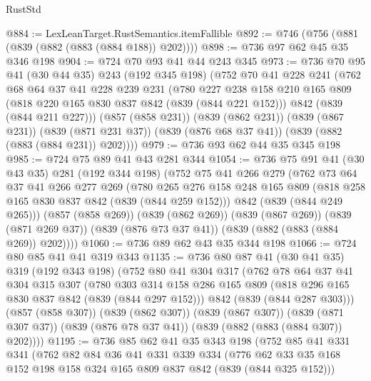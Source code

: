 \begin{lexlean}{RustStd}
\begin{coremodule}
@884 := LexLeanTarget.RustSemantics.itemFallible
@892 := @746 (@756 (@881 (@839 (@882 (@883 (@884 @188)) @202))))
@898 := @736 @97 @62 @45 @35 @346 @198
@904 := @724 @70 @93 @41 @44 @243 @345
@973 := @736
    @70
    @95
    @41
    (@30 @44 @35)
    @243
    (@192 @345 @198)
    (@752
      @70
      @41
      @228
      @241
      (@762
        @68
        @64
        @37
        @41
        @228
        @239
        @231
        (@780
          @227
          @238
          @158
          @210
          @165
          @809
          (@818 @220 @165 @830 @837 @842 (@839 (@844 @221 @152)))
          @842
          (@839 (@844 @211 @227)))
        (@857 (@858 @231))
        (@839 (@862 @231))
        (@839 (@867 @231))
        (@839 (@871 @231 @37))
        (@839 (@876 @68 @37 @41))
        (@839 (@882 (@883 (@884 @231)) @202))))
@979 := @736 @93 @62 @44 @35 @345 @198
@985 := @724 @75 @89 @41 @43 @281 @344
@1054 := @736
    @75
    @91
    @41
    (@30 @43 @35)
    @281
    (@192 @344 @198)
    (@752
      @75
      @41
      @266
      @279
      (@762
        @73
        @64
        @37
        @41
        @266
        @277
        @269
        (@780
          @265
          @276
          @158
          @248
          @165
          @809
          (@818 @258 @165 @830 @837 @842 (@839 (@844 @259 @152)))
          @842
          (@839 (@844 @249 @265)))
        (@857 (@858 @269))
        (@839 (@862 @269))
        (@839 (@867 @269))
        (@839 (@871 @269 @37))
        (@839 (@876 @73 @37 @41))
        (@839 (@882 (@883 (@884 @269)) @202))))
@1060 := @736 @89 @62 @43 @35 @344 @198
@1066 := @724 @80 @85 @41 @41 @319 @343
@1135 := @736
    @80
    @87
    @41
    (@30 @41 @35)
    @319
    (@192 @343 @198)
    (@752
      @80
      @41
      @304
      @317
      (@762
        @78
        @64
        @37
        @41
        @304
        @315
        @307
        (@780
          @303
          @314
          @158
          @286
          @165
          @809
          (@818 @296 @165 @830 @837 @842 (@839 (@844 @297 @152)))
          @842
          (@839 (@844 @287 @303)))
        (@857 (@858 @307))
        (@839 (@862 @307))
        (@839 (@867 @307))
        (@839 (@871 @307 @37))
        (@839 (@876 @78 @37 @41))
        (@839 (@882 (@883 (@884 @307)) @202))))
@1195 := @736
    @85
    @62
    @41
    @35
    @343
    @198
    (@752
      @85
      @41
      @331
      @341
      (@762
        @82
        @84
        @36
        @41
        @331
        @339
        @334
        (@776 @62 @33 @35 @168 @152 @198 @158 @324 @165 @809 @837 @842 (@839 (@844 @325 @152)))

\end{coremodule}
\end{lexlean}
